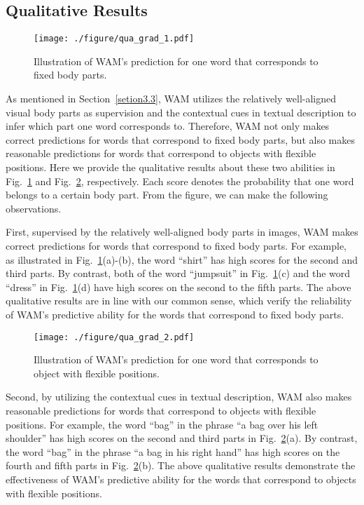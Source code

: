 \documentclass[journal]{IEEEtran}
\begin{document}
\subsection{Qualitative Results}

\begin{figure}
\begin{center}
\texttt{[image: ./figure/qua\_grad\_1.pdf]}
\end{center}
   \caption{Illustration of WAM's prediction for one word that corresponds to fixed body parts.}
\label{fig:qua_grad_1}
\end{figure}

As mentioned in Section~\ref{setion3.3}, WAM utilizes the relatively well-aligned visual body parts as supervision and the contextual cues in textual description to infer which part one word corresponds to. Therefore, WAM not only makes correct predictions for words that correspond to fixed body parts, but also makes reasonable predictions for words that correspond to objects with flexible positions. Here we provide the qualitative results about these two abilities in Fig.~\ref{fig:qua_grad_1} and Fig.~\ref{fig:qua_grad_2}, respectively. Each score denotes the probability that one word belongs to a certain body part. From the figure, we can make the following observations.

First, supervised by the relatively well-aligned body parts in images, WAM makes correct predictions for words that correspond to fixed body parts. For example, as illustrated in Fig.~\ref{fig:qua_grad_1}(a)-(b), the word ``shirt'' has high scores for the second and third parts. By contrast, both of the word ``jumpsuit''  in Fig.~\ref{fig:qua_grad_1}(c) and the word ``dress''  in Fig.~\ref{fig:qua_grad_1}(d) have high scores on the second to the fifth parts. The above qualitative results are in line with our common sense, which verify the reliability of WAM's predictive ability for the words that correspond to fixed body parts.

\begin{figure}
\begin{center}
\texttt{[image: ./figure/qua\_grad\_2.pdf]}
\end{center}
   \caption{Illustration of WAM's prediction for one word that corresponds to object with flexible positions.}
\label{fig:qua_grad_2}
\end{figure}

Second, by utilizing the contextual cues in textual description, WAM also makes reasonable predictions for words that correspond to objects with flexible positions. For example, the word ``bag'' in the phrase ``a bag over his left shoulder'' has high scores on the second and third parts in Fig.~\ref{fig:qua_grad_2}(a). By contrast, the word ``bag'' in the phrase ``a bag in his right hand'' has high scores on the fourth and fifth parts in Fig.~\ref{fig:qua_grad_2}(b). The above qualitative results demonstrate the effectiveness of WAM's predictive ability for the words that correspond to objects with flexible positions.
\end{document}
